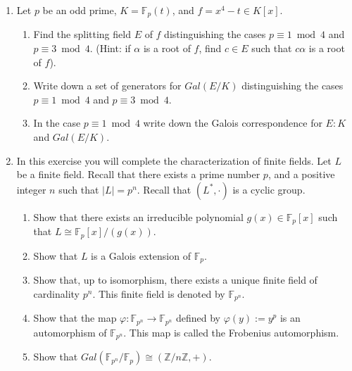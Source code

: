 \documentclass{article}
\begin{document}
\begin{enumerate}
    \item Let $p$ be an odd prime, $K = \mathbb{F}_{p}(t)$, and $f = x^4 - t \in K[x]$.
    \begin{enumerate}
        \item Find the splitting field $E$ of $f$ distinguishing the cases $p \equiv 1 \bmod 4$ and $p \equiv 3 \bmod 4$. (Hint: if $\alpha$ is a root of $f$, find $c \in E$ such that $c\alpha$ is a root of $f$).
        \item Write down a set of generators for $Gal(E/K)$ distinguishing the cases $p \equiv 1 \bmod 4$ and $p \equiv 3 \bmod 4$.
        \item In the case $p \equiv 1 \bmod 4$ write down the Galois correspondence for $E: K$ and $Gal(E/K)$.
    \end{enumerate}

    \item In this exercise you will complete the characterization of finite fields. Let $L$ be a finite field. Recall that there exists a prime number $p$, and a positive integer $n$ such that $|L| = p^n$. Recall that $(L^*, \cdot)$ is a cyclic group.
    \begin{enumerate}
        \item Show that there exists an irreducible polynomial $g(x) \in \mathbb{F}_{p}[x]$ such that $L \cong \mathbb{F}_{p}[x] / (g(x))$.
        \item Show that $L$ is a Galois extension of $\mathbb{F}_{p}$.
        \item Show that, up to isomorphism, there exists a unique finite field of cardinality $p^n$. This finite field is denoted by $\mathbb{F}_{p^n}$.
        \item Show that the map $\varphi: \mathbb{F}_{p^n} \longrightarrow \mathbb{F}_{p^n}$ defined by $\varphi(y) := y^p$ is an automorphism of $\mathbb{F}_{p^n}$. This map is called the Frobenius automorphism.
        \item Show that $Gal(\mathbb{F}_{p^n}/\mathbb{F}_{p}) \cong (\mathbb{Z} / n \mathbb{Z}, +)$.
    \end{enumerate}


\end{enumerate}
\end{document}
